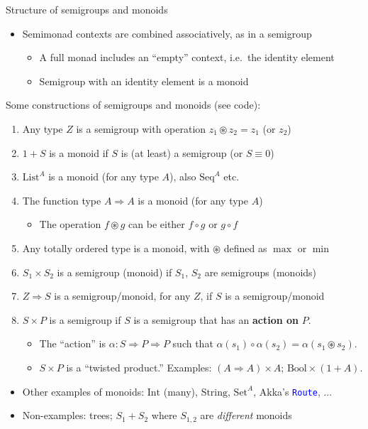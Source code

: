 \documentclass[english]{beamer}
\begin{document}
\begin{frame}{Structure of semigroups and monoids}

\begin{itemize}
\item Semimonad contexts are combined associatively, as in a semigroup
\begin{itemize}
\item A full monad includes an ``empty'' context, i.e.\ the identity
element
\item Semigroup with an identity element is a monoid
\end{itemize}
\end{itemize}
Some constructions of semigroups and monoids (see code):
\begin{enumerate}
\item Any type $Z$ is a semigroup with operation $z_{1}\circledast z_{2}=z_{1}$
(or $z_{2}$)
\item $1+S$ is a monoid if $S$ is (at least) a semigroup (or $S\equiv0$)
\item $\text{List}^{A}$ is a monoid (for any type $A$), also $\text{Seq}^{A}$
etc.
\item The function type $A\Rightarrow A$ is a monoid (for any type $A$)
\begin{itemize}
\item The operation $f\circledast g$ can be either $f\circ g$ or $g\circ f$
\end{itemize}
\item Any totally ordered type is a monoid, with $\circledast$ defined
as $\max$ or $\min$
\item $S_{1}\times S_{2}$ is a semigroup (monoid) if $S_{1}$, $S_{2}$
are semigroups (monoids)
\item $Z\Rightarrow S$ is a semigroup/monoid, for any $Z$, if $S$ is
a semigroup/monoid
\item $S\times P$ is a semigroup if $S$ is a semigroup that has an \textbf{action
on} $P$.
\begin{itemize}
\item The ``action'' is $\alpha:S\Rightarrow P\Rightarrow P$ such that
$\alpha(s_{1})\circ\alpha(s_{2})=\alpha(s_{1}\circledast s_{2})$.
\item $S\times P$ is a ``twisted product.'' Examples: $\left(A\Rightarrow A\right)\times A$;
$\text{Bool}\times\left(1+A\right)$.
\end{itemize}
\end{enumerate}
\begin{itemize}
\item Other examples of monoids: $\text{Int}$ (many), $\text{String}$,
$\text{Set}^{A}$, Akka's \texttt{\textcolor{blue}{\footnotesize{}Route}},
...
\item Non-examples: trees; $S_{1}+S_{2}$ where $S_{1,2}$ are \emph{different}
monoids
\end{itemize}
\end{frame}
\end{document}
